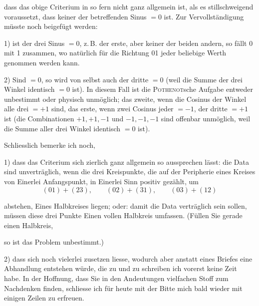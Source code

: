 dass das obige Criterium in so fern nicht ganz allgemein ist, als es stillschweigend voraussetzt, dass keiner der betreffenden Sinus $=0$ ist. Zur Vervollständigung müsste noch beigefügt werden:

1) ist  der drei Sinus $=0$, z.\,B. der erste, aber keiner der beiden andern, so fällt 0 mit 1 zusammen, wo natürlich für die Richtung 01 jeder beliebige Werth genommen werden kann.

2) Sind  $=0$, so wird von selbst auch der dritte $=0$ (weil die Summe der drei Winkel identisch $=0$ ist). In diesem Fall ist die \textsc{Pothenot}sche Aufgabe entweder unbestimmt oder physisch unmöglich; das zweite, wenn die Cosinus der Winkel alle drei $=+1$ sind, das erste, wenn zwei Cosinus jeder $=-1$, der dritte $=+1$ ist (die Combinationen $+1,+1,-1$ und $-1,-1,-1$ sind offenbar unmöglich, weil die Summe aller drei Winkel identisch $=0$ ist).

Schliesslich bemerke ich noch,

1) dass das Criterium sich zierlich ganz allgemein so aussprechen lässt: die Data sind unverträglich, wenn die drei Kreispunkte, die auf der Peripherie eines Kreises von Einerlei Anfangspunkt, in Einerlei Sinn positiv gezählt, um
\[
(01)+(23),\qquad (02)+(31),\qquad (03)+(12)
\]
\begin{minipage}{\linewidth}\raggedright\noindent abstehen,  Eines Halbkreises liegen; oder: damit die Data verträglich sein sollen, müssen diese drei Punkte  Einen vollen Halb\-kreis umfassen. (Füllen Sie gerade einen Halbkreis,

\begin{center}\end{center}

so ist das Problem unbestimmt.)
\end{minipage}

2) dass sich noch vielerlei zusetzen liesse, wodurch aber anstatt eines Briefes eine Abhandlung entstehen würde, die zu  und zu schreiben ich vorerst keine Zeit habe. In der Hoffnung, dass Sie in den Andeutungen vielfachen Stoff zum Nachdenken finden, schliesse ich für heute mit der Bitte mich bald wieder mit einigen Zeilen zu erfreuen.


